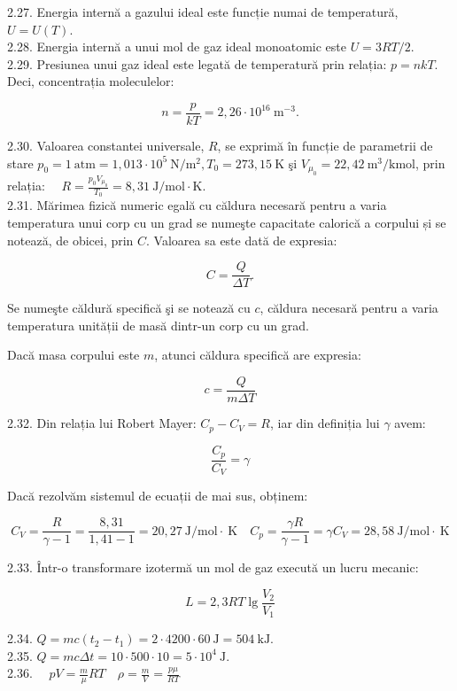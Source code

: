 \documentclass[10pt]{article}
\begin{document}
2.27. Energia internă a gazului ideal este funcție numai de temperatură, $U=U(T)$.\\
2.28. Energia internă a unui mol de gaz ideal monoatomic este $U=3 R T / 2$.\\
2.29. Presiunea unui gaz ideal este legată de temperatură prin relația: $p=n k T$. Deci, concentrația moleculelor:

$$
n=\frac{p}{k T}=2,26 \cdot 10^{16} \mathrm{~m}^{-3} .
$$

2.30. Valoarea constantei universale, $R$, se exprimă în funcție de parametrii de stare $p_{0}=1 \mathrm{~atm}=1,013 \cdot 10^{5} \mathrm{~N} / \mathrm{m}^{2}, T_{0}=273,15 \mathrm{~K}$ şi $V_{\mu_{0}}=22,42 \mathrm{~m}^{3} / \mathrm{kmol}$, prin relația: $\quad R=\frac{p_{0} V_{\mu_{0}}}{T_{0}}=8,31 \mathrm{~J} / \mathrm{mol} \cdot \mathrm{K}$.\\
2.31. Mărimea fizică numeric egală cu căldura necesară pentru a varia temperatura unui corp cu un grad se numeşte capacitate calorică a corpului și se notează, de obicei, prin $C$. Valoarea sa este dată de expresia:

$$
C=\frac{Q}{\Delta T} .
$$

Se numeşte căldură specifică şi se notează cu $c$, căldura necesară pentru a varia temperatura unității de masă dintr-un corp cu un grad.

Dacă masa corpului este $m$, atunci căldura specifică are expresia:

$$
c=\frac{Q}{m \Delta T}
$$

2.32. Din relația lui Robert Mayer: $C_{p}-C_{V}=R$, iar din definiția lui $\gamma$ avem:

$$
\frac{C_{p}}{C_{V}}=\gamma
$$

Dacă rezolvăm sistemul de ecuații de mai sus, obținem:

$$
C_{V}=\frac{R}{\gamma-1}=\frac{8,31}{1,41-1}=20,27 \mathrm{~J} / \mathrm{mol} \cdot \mathrm{~K} \quad C_{p}=\frac{\gamma R}{\gamma-1}=\gamma C_{V}=28,58 \mathrm{~J} / \mathrm{mol} \cdot \mathrm{~K}
$$

2.33. Într-o transformare izotermă un mol de gaz execută un lucru mecanic:

$$
L=2,3 R T \lg \frac{V_{2}}{V_{1}}
$$

2.34. $Q=m c\left(t_{2}-t_{1}\right)=2 \cdot 4200 \cdot 60 \mathrm{~J}=504 \mathrm{~kJ}$.\\
2.35. $Q=m c \Delta t=10 \cdot 500 \cdot 10=5 \cdot 10^{4} \mathrm{~J}$.\\
2.36. $\quad p V=\frac{m}{\mu} R T \quad \rho=\frac{m}{V}=\frac{p \mu}{R T}$
\end{document}
